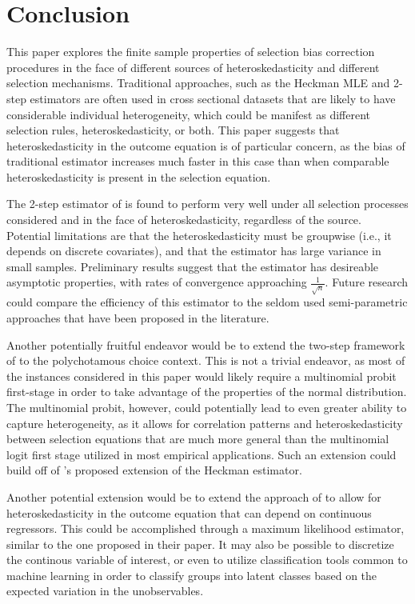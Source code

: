 \documentclass{article}
\begin{document}

\section{Conclusion}

This paper explores the finite sample properties of selection bias correction procedures in the face of different sources of heteroskedasticity and different selection mechanisms.  Traditional approaches, such as the Heckman MLE and 2-step estimators are often used in cross sectional datasets that are likely to have considerable individual heterogeneity, which could be manifest as different selection rules, heteroskedasticity, or both.  This paper suggests that heteroskedasticity in the outcome equation is of particular concern, as the bias of traditional estimator increases much faster in this case than when comparable heteroskedasticity is present in the selection equation.  

The 2-step estimator of \citet{reichert2014} is found to perform very well under all selection processes considered and in the face of heteroskedasticity, regardless of the source.  Potential limitations are that the heteroskedasticity must be groupwise (i.e., it depends on discrete covariates), and that the estimator has large variance in small samples.  Preliminary results suggest that the estimator has desireable asymptotic properties, with rates of convergence approaching $\frac{1}{\sqrt{n}}$.  Future research could compare the efficiency of this estimator to the seldom used semi-parametric approaches that have been proposed in the literature.

Another potentially fruitful endeavor would be to extend the two-step framework of \citet{reichert2014} to the polychotamous choice context.  This is not a trivial endeavor, as most of the instances considered in this paper would likely require a multinomial probit first-stage in order to take advantage of the properties of the normal distribution.  The multinomial probit, however, could potentially lead to even greater ability to capture heterogeneity, as it allows for correlation patterns and heteroskedasticity between selection equations that are much more general than the multinomial logit first stage utilized in most empirical applications.  Such an extension could build off of \citet{glewwe1993}'s proposed extension of the Heckman estimator.

Another potential extension would be to extend the approach of \citet{reichert2014} to allow for heteroskedasticity in the outcome equation that can depend on continuous regressors.  This could be accomplished through a maximum likelihood estimator, similar to the one proposed in their paper.  It may also be possible to discretize the continous variable of interest, or even to utilize classification tools common to machine learning in order to classify groups into latent classes based on the expected variation in the unobservables.
\end{document}
